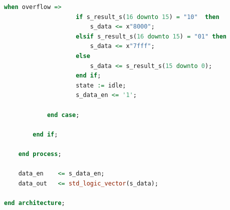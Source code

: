\begin{lstlisting}[language=VHDL, basicstyle=\ttfamily\tiny, lineskip=-2pt,
    caption={ADC Calibration Module},
    label={lst:fpga-calibration-entity}]
                when overflow =>
                    if s_result_s(16 downto 15) = "10"  then
                        s_data <= x"8000";
                    elsif s_result_s(16 downto 15) = "01" then
                        s_data <= x"7fff";
                    else
                        s_data <= s_result_s(15 downto 0);
                    end if;
                    state := idle;
                    s_data_en <= '1';

            end case;

        end if;

    end process;

    data_en    <= s_data_en;
    data_out   <= std_logic_vector(s_data);

end architecture;
\end{lstlisting}


